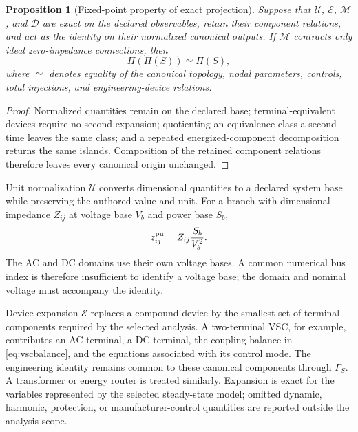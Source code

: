 \documentclass[final,5p,times,twocolumn]{elsarticle}
\newcommand{\Proj}{\Pi}
\newtheorem{proposition}{Proposition}
\begin{document}
\begin{proposition}[Fixed-point property of exact projection]
\label{prop:projection-idempotence}
Suppose that $\mathcal U$, $\mathcal E$, $\mathcal M$, and $\mathcal D$ are
exact on the declared observables, retain their component relations, and act as
the identity on their normalized canonical outputs. If $\mathcal M$ contracts
only ideal zero-impedance connections, then
\begin{equation}
 \Proj(\Proj(S))\simeq\Proj(S),
 \label{eq:projection-idempotence}
\end{equation}
where $\simeq$ denotes equality of the canonical topology, nodal parameters,
controls, total injections, and engineering-device relations.
\end{proposition}
\begin{proof}
Normalized quantities remain on the declared base; terminal-equivalent devices
require no second expansion; quotienting an equivalence class a second time
leaves the same class; and a repeated energized-component decomposition returns
the same islands. Composition of the retained component relations therefore
leaves every canonical origin unchanged.
\end{proof}

Unit normalization $\mathcal U$ converts dimensional quantities to a declared
system base while preserving the authored value and unit. For a branch with
dimensional impedance $Z_{ij}$ at voltage base $V_b$ and power base $S_b$,
\begin{equation}
 z_{ij}^{\rm pu}=Z_{ij}\frac{S_b}{V_b^2}.
 \label{eq:unit-normalization}
\end{equation}
The AC and DC domains use their own voltage bases. A common numerical bus index
is therefore insufficient to identify a voltage base; the domain and nominal
voltage must accompany the identity.

Device expansion $\mathcal E$ replaces a compound device by the smallest set of
terminal components required by the selected analysis. A two-terminal VSC, for
example, contributes an AC terminal, a DC terminal, the coupling balance in
\eqref{eq:vscbalance}, and the equations associated with its control mode. The
engineering identity remains common to these canonical components through
$\Gamma_S$. A transformer or energy router is treated similarly. Expansion is
exact for the variables represented by the selected steady-state model; omitted
dynamic, harmonic, protection, or manufacturer-control quantities are reported
outside the analysis scope.
\end{document}
